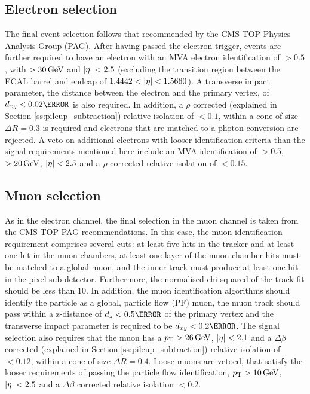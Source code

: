 \subsection{Electron selection}
\label{electronplusjetschannelselection}
The final event selection follows that recommended by the CMS TOP Physics Analysis Group (PAG). After having
passed the electron trigger, events are further required to have an electron with an MVA electron
identification of $>0.5$, with \Et $> 30\,\text{Ge\hspace{-.08em}V}$ and $|\eta| < 2.5$ (excluding the transition region between
the ECAL barrel and endcap of $1.4442 < |\eta| < 1.5660$). A transverse impact parameter, the distance
between the electron and the primary vertex, of $d_{xy} < 0.02\cm$ is also required. In addition, a $\rho$
corrected (explained in Section \ref{ss:pileup_subtraction}) relative isolation of $< 0.1$, within a cone of size
$\Delta R = 0.3$ is required and electrons that are matched to a photon conversion are rejected. 
A veto on additional electrons with looser identification criteria than the signal requirements mentioned here
include an MVA identification of $> 0.5$, \Et $> 20\,\text{Ge\hspace{-.08em}V}$, $|\eta| < 2.5$ and a $\rho$ corrected relative
isolation of $<0.15$.

\subsection{Muon selection}
\label{muonplusjetschannelselection}
As in the electron channel, the final selection in the muon channel is taken from the CMS TOP PAG
recommendations. In this case, the muon identification requirement comprises several cuts: at least five hits
in the tracker and at least one hit in the muon chambers, at least one layer of the muon chamber hits must be
matched to a global muon, and the inner track must produce at least one hit in the pixel sub detector.
Furthermore, the normalised chi-squared of the track fit should be less than 10.  In addition, the muon
identification algorithms should identify the particle as a global, particle flow (PF) muon, the muon track
should pass within a z-distance of $d_{z} < 0.5\cm$ of the primary vertex and the transverse impact parameter
is required to be $d_{xy} < 0.2\cm$. The signal selection also requires that the muon has a $p_{\mathrm{T}} > 26\,\text{Ge\hspace{-.08em}V}$,
$|\eta| < 2.1$ and a $\Delta\beta$ corrected (explained in Section \ref{ss:pileup_subtraction}) relative
isolation of $< 0.12$, within a cone of size $\Delta R = 0.4$. Loose muons are vetoed, that satisfy the looser
requirements of passing the particle flow identification, $p_{\mathrm{T}} > 10\,\text{Ge\hspace{-.08em}V}$, $|\eta| < 2.5$ and a $\Delta\beta$
corrected relative isolation $<0.2$.

